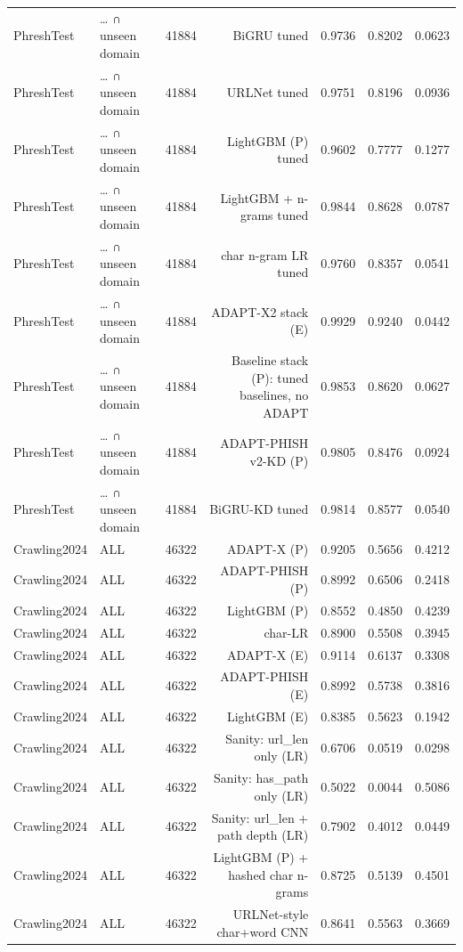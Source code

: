 \begin{table}[t]
\begin{tabular}{llrrrrr}
PhreshTest & … ∩ unseen domain & 41884 & BiGRU tuned & 0.9736 & 0.8202 & 0.0623 \\
PhreshTest & … ∩ unseen domain & 41884 & URLNet tuned & 0.9751 & 0.8196 & 0.0936 \\
PhreshTest & … ∩ unseen domain & 41884 & LightGBM (P) tuned & 0.9602 & 0.7777 & 0.1277 \\
PhreshTest & … ∩ unseen domain & 41884 & LightGBM + n-grams tuned & 0.9844 & 0.8628 & 0.0787 \\
PhreshTest & … ∩ unseen domain & 41884 & char n-gram LR tuned & 0.9760 & 0.8357 & 0.0541 \\
PhreshTest & … ∩ unseen domain & 41884 & ADAPT-X2 stack (E) & 0.9929 & 0.9240 & 0.0442 \\
PhreshTest & … ∩ unseen domain & 41884 & Baseline stack (P): tuned baselines, no ADAPT & 0.9853 & 0.8620 & 0.0627 \\
PhreshTest & … ∩ unseen domain & 41884 & ADAPT-PHISH v2-KD (P) & 0.9805 & 0.8476 & 0.0924 \\
PhreshTest & … ∩ unseen domain & 41884 & BiGRU-KD tuned & 0.9814 & 0.8577 & 0.0540 \\
Crawling2024 & ALL & 46322 & ADAPT-X (P) & 0.9205 & 0.5656 & 0.4212 \\
Crawling2024 & ALL & 46322 & ADAPT-PHISH (P) & 0.8992 & 0.6506 & 0.2418 \\
Crawling2024 & ALL & 46322 & LightGBM (P) & 0.8552 & 0.4850 & 0.4239 \\
Crawling2024 & ALL & 46322 & char-LR & 0.8900 & 0.5508 & 0.3945 \\
Crawling2024 & ALL & 46322 & ADAPT-X (E) & 0.9114 & 0.6137 & 0.3308 \\
Crawling2024 & ALL & 46322 & ADAPT-PHISH (E) & 0.8992 & 0.5738 & 0.3816 \\
Crawling2024 & ALL & 46322 & LightGBM (E) & 0.8385 & 0.5623 & 0.1942 \\
Crawling2024 & ALL & 46322 & Sanity: url\_len only (LR) & 0.6706 & 0.0519 & 0.0298 \\
Crawling2024 & ALL & 46322 & Sanity: has\_path only (LR) & 0.5022 & 0.0044 & 0.5086 \\
Crawling2024 & ALL & 46322 & Sanity: url\_len + path depth (LR) & 0.7902 & 0.4012 & 0.0449 \\
Crawling2024 & ALL & 46322 & LightGBM (P) + hashed char n-grams & 0.8725 & 0.5139 & 0.4501 \\
Crawling2024 & ALL & 46322 & URLNet-style char+word CNN & 0.8641 & 0.5563 & 0.3669 \\

\end{tabular}
\end{table}
